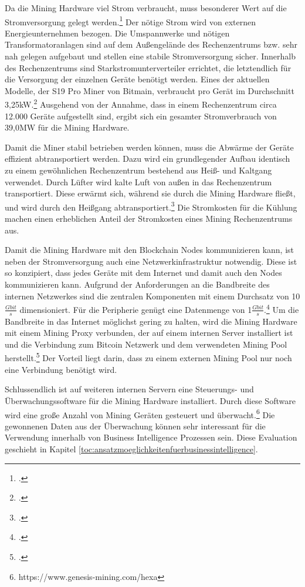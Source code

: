 Da die Mining Hardware viel Strom verbraucht, muss besonderer Wert auf die Stromversorgung gelegt
werden.\footcite[Cf.][p. 327]{derks2018chaining} Der nötige Strom wird von externen Energieunternehmen bezogen. Die
Umspannwerke und nötigen Transformatoranlagen sind auf dem Außengelände des Rechenzentrums bzw. sehr nah gelegen
aufgebaut und stellen eine stabile Stromversorgung sicher. Innerhalb des Rechenzentrums sind Starkstromunterverteiler
errichtet, die letztendlich für die Versorgung der einzelnen Geräte benötigt werden. Eines der aktuellen Modelle,
der S19 Pro Miner von Bitmain, verbraucht pro Gerät im Durchschnitt 3,25kW.\footcite[Cf.][]{s19pro2021consumption}
Ausgehend von der Annahme, dass in einem Rechenzentrum circa 12.000 Geräte aufgestellt sind, ergibt sich ein gesamter
Stromverbrauch von 39,0MW für die Mining Hardware.

Damit die Miner stabil betrieben werden können, muss die Abwärme der Geräte effizient abtransportiert werden. Dazu
wird ein grundlegender Aufbau identisch zu einem gewöhnlichen Rechenzentrum bestehend aus Heiß- und Kaltgang verwendet.
Durch Lüfter wird kalte Luft von außen in das Rechenzentrum transportiert. Diese erwärmt sich, während sie durch die
Mining Hardware fließt, und wird durch den Heißgang abtransportiert.\footcite[Cf.][]{appendix:layoutkardok} Die
Stromkosten für die Kühlung machen einen erheblichen Anteil der Stromkosten eines Mining Rechenzentrums aus.

Damit die Mining Hardware mit den Blockchain Nodes kommunizieren kann, ist neben der Stromversorgung auch eine
Netzwerkinfrastruktur notwendig. Diese ist so konzipiert, dass jedes Geräte mit dem Internet und damit auch den Nodes
kommunizieren kann. Aufgrund der Anforderungen an die Bandbreite des internen Netzwerkes sind die zentralen
Komponenten mit einem Durchsatz von 10$\frac{Gbit}{s}$ dimensioniert. Für die Peripherie genügt eine Datenmenge
von 1$\frac{Gbit}{s}$.\footcite[Cf.][]{appendix:networktopology} Um die Bandbreite in das Internet möglichst
gering zu halten, wird die Mining Hardware mit einem Mining Proxy verbunden, der auf einem internen Server
installiert ist und die Verbindung zum Bitcoin Netzwerk und dem verwendeten Mining Pool
herstellt.\footcite[Cf.][]{appendix:miningproxy} Der Vorteil liegt darin, dass zu einem externen Mining Pool
nur noch eine Verbindung benötigt wird.

Schlussendlich ist auf weiteren internen Servern eine Steuerungs- und Überwachungssoftware für die Mining Hardware
installiert. Durch diese Software wird eine große Anzahl von Mining Geräten gesteuert und
überwacht.\footnote{https://www.genesis-mining.com/hexa} Die gewonnenen Daten aus der Überwachung können sehr
interessant für die Verwendung innerhalb von Business Intelligence Prozessen sein. Diese Evaluation geschieht
in Kapitel \ref{toc:ansatzmoeglichkeitenfuerbusinessintelligence}.

